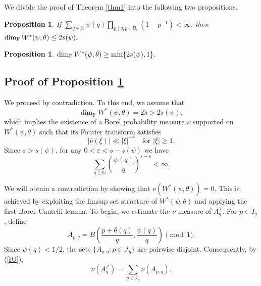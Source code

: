 \documentclass[12pt,a4paper,twoside]{article}
\newtheorem{proposition}[lem]{Proposition}
\begin{document}
We divide the proof of Theorem \ref{thm1} into the following two propositions.


\begin{proposition}\label{p1}
    If $\sum_{q\in\mathbb{N}}\psi(q)\prod_{p\mid q,p\nmid B_q}(1-p^{-1})<\infty$, then~$\dim_{{\rm F}}W^{\ast}(\psi,\theta)\le 2s(\psi).$
\end{proposition}


\begin{proposition}\label{p2}
    $\dim_{{\rm F}}W^{\ast}(\psi,\theta)\ge \min\{2s(\psi),1\}.$
\end{proposition}







\subsection{Proof of Proposition \ref{p1}}
We proceed by contradiction. To this end, we assume that
\[
\dim_{\mathrm{F}} W^{\ast}(\psi,\theta) = 2s > 2s(\psi),
\]
which implies the existence of a Borel probability measure \(\nu\) supported on \(W^{\ast}(\psi,\theta)\) such that its Fourier transform satisfies
\[
|\widehat{\nu}(\xi)| \ll |\xi|^{-s} \quad \text{for } |\xi| \ge 1.
\]
Since $s > s(\psi)$, for any $0 < \varepsilon < s - s(\psi)$ we have
\[
\sum_{q \in \mathbb{N}} \left( \frac{\psi(q)}{q} \right)^{s - \varepsilon} < \infty.
\]

We will obtain a contradiction by showing that $\nu(W^{\ast}(\psi,\theta)) = 0$. This is achieved by exploiting the limsup set structure of $W^{\ast}(\psi,\theta)$ and applying the first Borel--Cantelli lemma. To begin, we estimate the $\nu$-measure of $A_q^{\mathcal{I}}$. For $p \in I_q$, define
\[
A_{p,q} = B\!\left( \frac{p + \theta(q)}{q}, \frac{\psi(q)}{q} \right) \pmod{1}.
\]
Since \(\psi(q) < 1/2\), the sets \(\{A_{p,q}\colon p \in \mathcal{I}_q\}\) are pairwise disjoint. Consequently, by (\ref{IU}),
\[
\nu(A_q^{\mathcal{I}}) = \sum_{p \in \mathcal{I}_q} \nu(A_{p,q}).
\]
\end{document}
